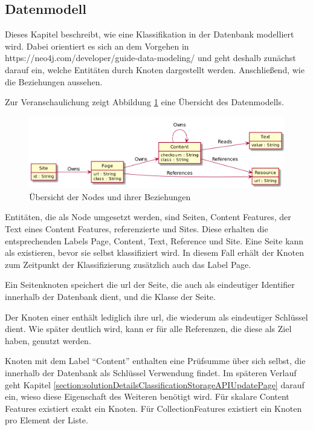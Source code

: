 \subsection{Datenmodell}
    \label{section:solutionDetailsPersistenceDataModel}
    Dieses Kapitel beschreibt, wie eine Klassifikation in der Datenbank modelliert wird.
    Dabei orientiert es sich an dem Vorgehen in https://neo4j.com/developer/guide-data-modeling/
    und geht deshalb zunächst darauf ein, welche Entitäten durch Knoten dargestellt werden.
    Anschließend, wie die Beziehungen aussehen.

    Zur Veranschaulichung zeigt Abbildung \ref{image:dbDataModelOverview} eine Übersicht des Datenmodells.

    \begin{figure}
        \centering
        \includegraphics[width=\textwidth]{../resources/db-data-model/nodes.png}
        \caption{Übersicht der Nodes und ihrer Beziehungen}
        \label{image:dbDataModelOverview}
    \end{figure}

    Entitäten, die als Node umgesetzt werden, sind Seiten, Content Features,
    der Text eines Content Features, referenzierte {\resources} und Sites.
    Diese erhalten die entsprechenden Labels Page, Content, Text, Reference und Site.
    Eine Seite kann als {\resource} existieren, bevor sie selbst klassifiziert wird.
    In diesem Fall erhält der Knoten zum Zeitpunkt der Klassifizierung zusätzlich auch das Label Page.

    Ein Seitenknoten speichert die \gls{url} der Seite, die auch als eindeutiger Identifier innerhalb der Datenbank dient,
    und die Klasse der Seite.

    Der Knoten einer {\resource} enthält lediglich ihre \gls{url}, die wiederum als eindeutiger Schlüssel dient.
    Wie später deutlich wird, kann er für alle Referenzen, die diese {\resource} als Ziel haben, genutzt werden.

    Knoten mit dem Label "`Content"' enthalten eine Prüfsumme über sich selbst, die innerhalb der Datenbank als Schlüssel Verwendung findet.
    Im späteren Verlauf geht Kapitel \ref{section:solutionDetailsClassificationStorageAPIUpdatePage} darauf ein,
    wieso diese Eigenschaft des Weiteren benötigt wird.
    Für skalare Content Features existiert exakt ein Knoten.
    Für CollectionFeatures existiert ein Knoten pro Element der Liste.

